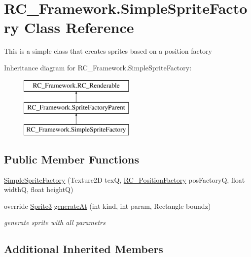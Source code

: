 \hypertarget{class_r_c___framework_1_1_simple_sprite_factory}{}\section{R\+C\+\_\+\+Framework.\+Simple\+Sprite\+Factory Class Reference}
\label{class_r_c___framework_1_1_simple_sprite_factory}


This is a simple class that creates sprites based on a position factory  


Inheritance diagram for R\+C\+\_\+\+Framework.\+Simple\+Sprite\+Factory\+:\begin{figure}[H]
\begin{center}
\leavevmode
\includegraphics[height=3.000000cm]{class_r_c___framework_1_1_simple_sprite_factory}
\end{center}
\end{figure}
\subsection*{Public Member Functions}
\begin{DoxyCompactItemize}
\item 
\mbox{\hyperlink{class_r_c___framework_1_1_simple_sprite_factory_ad978a3be1e1b931e9ce3f617d95b79bb}{Simple\+Sprite\+Factory}} (Texture2D texQ, \mbox{\hyperlink{class_r_c___framework_1_1_r_c___position_factory}{R\+C\+\_\+\+Position\+Factory}} pos\+FactoryQ, float widthQ, float heightQ)
\item 
override \mbox{\hyperlink{class_r_c___framework_1_1_sprite3}{Sprite3}} \mbox{\hyperlink{class_r_c___framework_1_1_simple_sprite_factory_ab008431fcc3f967b70de9a155d1a529a}{generate\+At}} (int kind, int param, Rectangle boundz)
\begin{DoxyCompactList}\small\item\em generate sprite with all parametrs \end{DoxyCompactList}\end{DoxyCompactItemize}
\subsection*{Additional Inherited Members}


